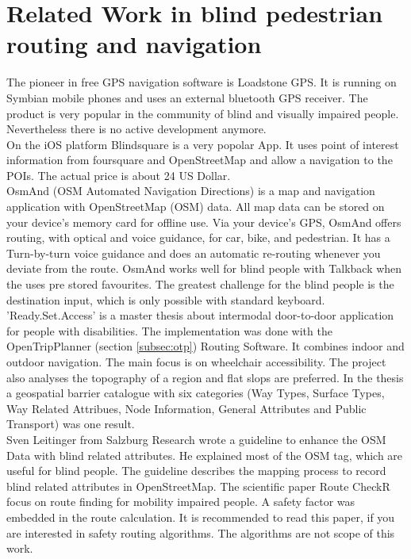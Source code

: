 \documentclass{sig-alternate}
\begin{document}
\section{Related Work in blind pedestrian routing and navigation}
The pioneer in free GPS navigation software is Loadstone GPS\cite{loadstone}. It is running on Symbian mobile phones and uses an external bluetooth GPS receiver. The product is very popular in the community of blind and visually impaired people. Nevertheless there is no active development anymore. \\
On the iOS platform Blindsquare\cite{blindsquare} is a very popolar App. It uses point of interest information from foursquare and OpenStreetMap and allow a navigation to the POIs. The actual price is about 24 US Dollar. \\
OsmAnd (OSM Automated Navigation Directions) is a map and navigation application with OpenStreetMap (OSM) data. All map data can be stored on your device's memory card for offline use. Via your device's GPS, OsmAnd offers routing, with optical and voice guidance, for car, bike, and pedestrian. It has a Turn-by-turn voice guidance and does an automatic re-routing whenever you deviate from the route. OsmAnd works well for blind people with Talkback when the uses pre stored favourites. The greatest challenge for the blind people is the destination input, which is only possible with standard keyboard.  \\
'Ready.Set.Access'\cite{weyrer} is a master thesis about intermodal door-to-door application for people with disabilities. The implementation was done with the OpenTripPlanner (section \ref{subsec:otp}) Routing Software. It combines indoor and outdoor navigation. The main focus is on wheelchair accessibility. The project also analyses the topography of a region and flat slops are preferred. In the thesis a geospatial barrier catalogue with six categories (Way Types, Surface Types, Way Related Attribues, Node Information, General Attributes and Public Transport) was one result. \\
Sven Leitinger\cite{sven:osm} from Salzburg Research wrote a guideline to enhance the OSM Data with blind related attributes. He explained most of the OSM tag, which are useful for blind people. The guideline describes the mapping process to record blind related attributes in OpenStreetMap.
The scientific paper\cite{Volkel:2008} Route CheckR focus on route finding for mobility impaired people. A safety factor was embedded in the route calculation. It is recommended to read this paper, if you are interested in safety routing algorithms. The algorithms are not scope of this work.  
\end{document}
